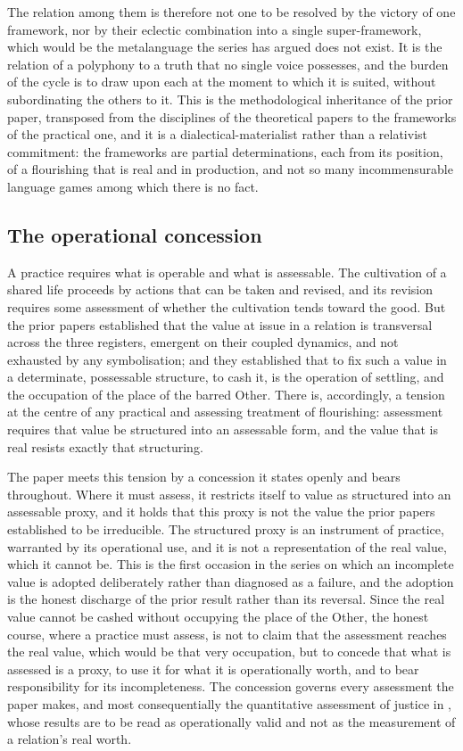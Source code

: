 The relation among them is therefore not one to be resolved by the victory of one framework, nor by their eclectic combination into a single super-framework, which would be the metalanguage the series has argued does not exist. It is the relation of a polyphony to a truth that no single voice possesses, and the burden of the cycle is to draw upon each at the moment to which it is suited, without subordinating the others to it. This is the methodological inheritance of the prior paper, transposed from the disciplines of the theoretical papers to the frameworks of the practical one, and it is a dialectical-materialist rather than a relativist commitment: the frameworks are partial determinations, each from its position, of a flourishing that is real and in production, and not so many incommensurable language games among which there is no fact.

\subsection{The operational concession}
\label{p11:sec:bg-concession}

A practice requires what is operable and what is assessable. The cultivation of a shared life proceeds by actions that can be taken and revised, and its revision requires some assessment of whether the cultivation tends toward the good. But the prior papers established that the value at issue in a relation is transversal across the three registers, emergent on their coupled dynamics, and not exhausted by any symbolisation; and they established that to fix such a value in a determinate, possessable structure, to cash it, is the operation of settling, and the occupation of the place of the barred Other. There is, accordingly, a tension at the centre of any practical and assessing treatment of flourishing: assessment requires that value be structured into an assessable form, and the value that is real resists exactly that structuring.

The paper meets this tension by a concession it states openly and bears throughout. Where it must assess, it restricts itself to value as structured into an assessable proxy, and it holds that this proxy is not the value the prior papers established to be irreducible. The structured proxy is an instrument of practice, warranted by its operational use, and it is not a representation of the real value, which it cannot be. This is the first occasion in the series on which an incomplete value is adopted deliberately rather than diagnosed as a failure, and the adoption is the honest discharge of the prior result rather than its reversal. Since the real value cannot be cashed without occupying the place of the Other, the honest course, where a practice must assess, is not to claim that the assessment reaches the real value, which would be that very occupation, but to concede that what is assessed is a proxy, to use it for what it is operationally worth, and to bear responsibility for its incompleteness. The concession governs every assessment the paper makes, and most consequentially the quantitative assessment of justice in , whose results are to be read as operationally valid and not as the measurement of a relation's real worth.

